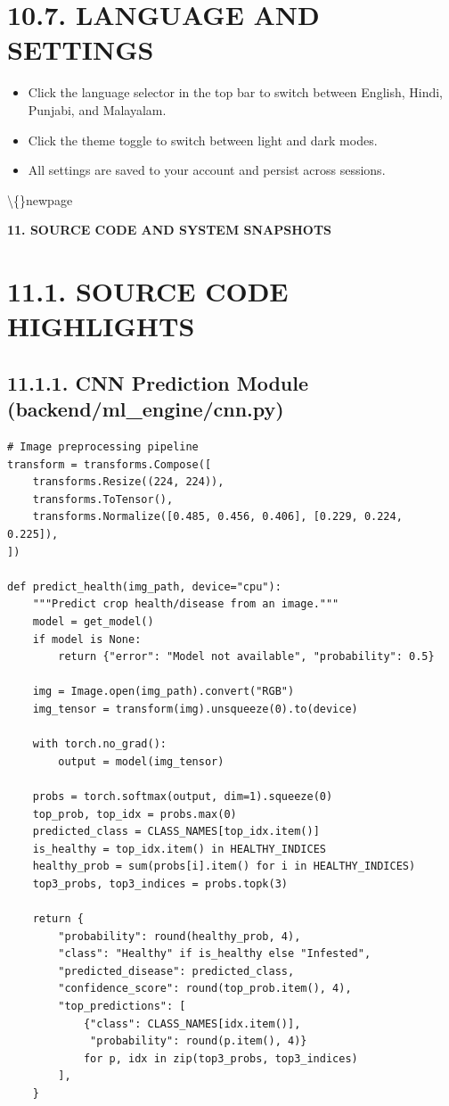 \documentclass[12pt, a4paper]{report}
\begin{document}
\begin{enumerate}[leftmargin=*]
\begin{enumerate}[leftmargin=*]
\section{10.7. LANGUAGE AND SETTINGS}
\begin{itemize}[leftmargin=*]
  \item Click the language selector in the top bar to switch between English, Hindi, Punjabi, and Malayalam.
  \item Click the theme toggle to switch between light and dark modes.
  \item All settings are saved to your account and persist across sessions.
\end{itemize}
\textbackslash\{\}newpage

\begin{center}
{\fontsize{14}{17}\bfseries 11. SOURCE CODE AND SYSTEM SNAPSHOTS}\\
\end{center}
\section{11.1. SOURCE CODE HIGHLIGHTS}
\subsection{11.1.1. CNN Prediction Module (backend/ml_engine/cnn.py)}
\begin{Verbatim}[fontsize=\small]
# Image preprocessing pipeline
transform = transforms.Compose([
    transforms.Resize((224, 224)),
    transforms.ToTensor(),
    transforms.Normalize([0.485, 0.456, 0.406], [0.229, 0.224, 0.225]),
])

def predict_health(img_path, device="cpu"):
    """Predict crop health/disease from an image."""
    model = get_model()
    if model is None:
        return {"error": "Model not available", "probability": 0.5}

    img = Image.open(img_path).convert("RGB")
    img_tensor = transform(img).unsqueeze(0).to(device)

    with torch.no_grad():
        output = model(img_tensor)

    probs = torch.softmax(output, dim=1).squeeze(0)
    top_prob, top_idx = probs.max(0)
    predicted_class = CLASS_NAMES[top_idx.item()]
    is_healthy = top_idx.item() in HEALTHY_INDICES
    healthy_prob = sum(probs[i].item() for i in HEALTHY_INDICES)
    top3_probs, top3_indices = probs.topk(3)

    return {
        "probability": round(healthy_prob, 4),
        "class": "Healthy" if is_healthy else "Infested",
        "predicted_disease": predicted_class,
        "confidence_score": round(top_prob.item(), 4),
        "top_predictions": [
            {"class": CLASS_NAMES[idx.item()],
             "probability": round(p.item(), 4)}
            for p, idx in zip(top3_probs, top3_indices)
        ],
    }
\end{Verbatim}

\end{enumerate}
\end{enumerate}
\end{document}
